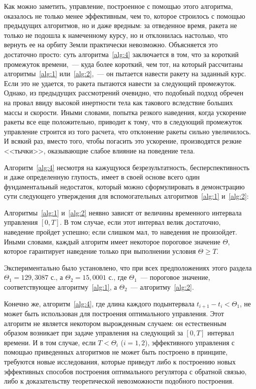 Как можно заметить, управление, построенное с помощью этого алгоритма, оказалось не только менее эффективным, чем то, которое строилось с помощью предыдущих алгоритмов, но и даже вредным: за отведенное время, ракета не только не подошла к намеченному курсу, но и отклонилась настолько, что вернуть ее на орбиту Земли практически невозможно. Объясняется это достаточно просто: суть алгоритма~\ref{alg:4} заключается в том, что за короткий промежуток времени,~--- куда более короткий, чем тот, на который рассчитаны алгоритмы~\ref{alg:1} или~\ref{alg:2},~--- он пытается навести ракету на заданный курс. Если это не удается, то ракета пытаются навести за следующий промежуток. Однако, из предыдущих рассмотрений очевидно, что подобный подход обречен на провал ввиду высокой инертности тела как такового вследствие больших массы и скорости. Иными словами, попытка резкого наведения, когда ускорение ракеты все еще положительно, приводит к тому, что в следующий промежуток управление строится из того расчета, что отклонение ракеты сильно увеличилось. И всякий раз, вместо того, чтобы погасить это ускорение, производятся резкие <<тычки>>, оказывающие слабое влияние на поведение тела.

Алгоритм~\ref{alg:4} несмотря на кажущуюся безрезультатность, бесперспективность и даже определенную глупость, имеет в своей основе всего один фундаментальный недостаток, который можно сформулировать в демонстрацию сути следующего утверждения для вспомогательных алгоритмов~\ref{alg:1} и~\ref{alg:2}:

\begin{statement}
    Алгоритмы~\ref{alg:1} и~\ref{alg:2} неявно зависят от величины временного интервала управления $[0,T]$. В том случае, если этот интервал велик достаточно, наведение пройдет успешно; если слишком мал, то наведения не произойдет. Иными словами, каждый алгоритм имеет некоторое пороговое значение $\Theta$, которое гарантирует наведение только при выполнении условия $\Theta \geqslant T$.
\end{statement}

Экспериментально было установлено, что при всех предположениях этого раздела $\Theta_1=129,3087$ с., а $\Theta_2=15,0001$ с., где $\Theta_1$~--- пороговое значение, соответствующее алгоритму~\ref{alg:1}, а $\Theta_2$~--- алгоритму~\ref{alg:2}.

Конечно же, алгоритм~\ref{alg:4}, где длина каждого подынтервала $t_{i+1}-t_i < \Theta_1$, не может быть использован для построения оптимального управления. Этот алгоритм не является некотором вырожденным случаем: он естественным образом возникает при задаче управления на следующий за $[0,T]$ интервал времени. И в том случае, если $T<\Theta_i$ ($i=1,2$), эффективного управления с помощью приведенных алгоритмов не может быть построено в принципе, требуются новые исследования, которые приведут либо к построению новых эффективных способов построения оптимального регулятора с обратной связью, либо к доказательству теоретической невозможности подобного построения.
